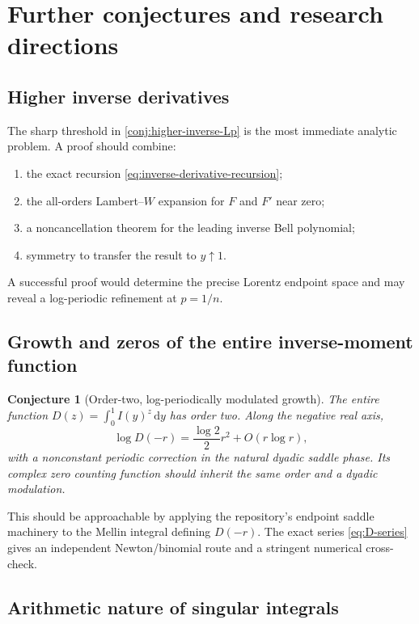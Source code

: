 \documentclass[11pt]{article}
\newtheorem{conjecture}[theorem]{Conjecture}
\theoremstyle{definition}
\theoremstyle{remark}
\newcommand{\dd}{\,\mathrm d}
\begin{document}
\clearpage
\section{Further conjectures and research directions}

\subsection{Higher inverse derivatives}

The sharp threshold in \cref{conj:higher-inverse-Lp} is the most immediate analytic
problem.  A proof should combine:
\begin{enumerate}
  \item the exact recursion \eqref{eq:inverse-derivative-recursion};
  \item the all-orders Lambert--\(W\) expansion for \(F\) and \(F'\) near zero;
  \item a noncancellation theorem for the leading inverse Bell polynomial;
  \item symmetry to transfer the result to \(y\uparrow1\).
\end{enumerate}
A successful proof would determine the precise Lorentz endpoint space and may reveal a
log-periodic refinement at \(p=1/n\).

\subsection{Growth and zeros of the entire inverse-moment function}

\begin{conjecture}[Order-two, log-periodically modulated growth]
The entire function \(D(z)=\int_0^1I(y)^z\dd y\) has order two.  Along the negative
real axis,
\begin{equation}
 \log D(-r)=\frac{\log2}{2}r^2+O(r\log r),                \label{eq:D-order-conj}
\end{equation}
with a nonconstant periodic correction in the natural dyadic saddle phase.  Its complex
zero counting function should inherit the same order and a dyadic modulation.
\end{conjecture}

This should be approachable by applying the repository's endpoint saddle machinery to
the Mellin integral defining \(D(-r)\).  The exact series \eqref{eq:D-series} gives an
independent Newton/binomial route and a stringent numerical cross-check.

\subsection{Arithmetic nature of singular integrals}
\end{document}
